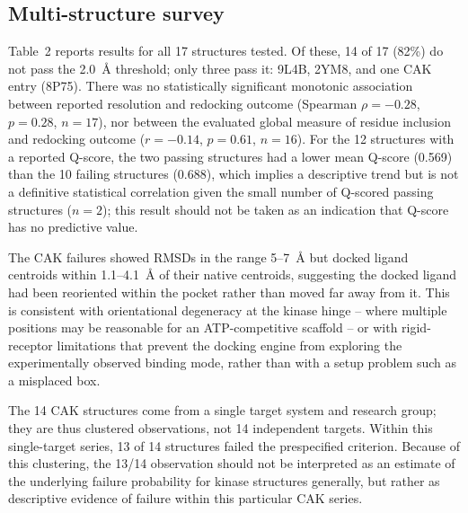 \documentclass[global,twocolumn]{svjour}
\begin{document}
\subsection{Multi-structure survey}

Table~2 reports results for all 17 structures tested. Of these, 14 of 17
(82\%) do not pass the 2.0~\AA{} threshold; only three pass it: 9L4B, 2YM8,
and one CAK entry (8P75). There was no statistically significant monotonic
association between reported resolution and redocking outcome (Spearman
$\rho=-0.28$, $p=0.28$, $n=17$), nor between the evaluated global measure
of residue inclusion and redocking outcome ($r=-0.14$, $p=0.61$, $n=16$).
For the 12 structures with a reported Q-score, the two passing structures
had a lower mean Q-score (0.569) than the 10 failing structures (0.688),
which implies a descriptive trend but is not a definitive statistical
correlation given the small number of Q-scored passing structures
($n=2$); this result should not be taken as an indication that Q-score has
no predictive value.

The CAK failures showed RMSDs in the range 5--7~\AA{} but docked ligand
centroids within 1.1--4.1~\AA{} of their native centroids, suggesting the
docked ligand had been reoriented within the pocket rather than moved far
away from it. This is consistent with orientational degeneracy at the
kinase hinge -- where multiple positions may be reasonable for an
ATP-competitive scaffold -- or with rigid-receptor limitations that prevent
the docking engine from exploring the experimentally observed binding
mode, rather than with a setup problem such as a misplaced box.

The 14 CAK structures come from a single target system and research group;
they are thus clustered observations, not 14 independent targets. Within
this single-target series, 13 of 14 structures failed the prespecified
criterion. Because of this clustering, the 13/14 observation should not be
interpreted as an estimate of the underlying failure probability for
kinase structures generally, but rather as descriptive evidence of failure
within this particular CAK series.
\end{document}
